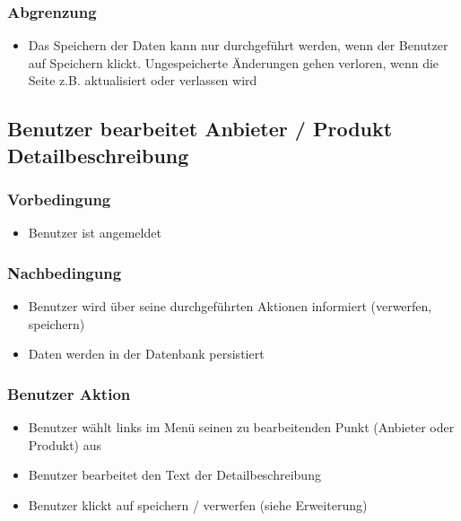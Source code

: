 \documentclass[a4paper,12pt]{article}
\begin{document}
\subsubsection{Abgrenzung}\label{abgrenzung-2}

\begin{itemize}

\item
  Das Speichern der Daten kann nur durchgeführt werden, wenn der
  Benutzer auf Speichern klickt. Ungespeicherte Änderungen gehen
  verloren, wenn die Seite z.B. aktualisiert oder verlassen wird
\end{itemize}

\subsection{Benutzer bearbeitet Anbieter / Produkt Detailbeschreibung}

\subsubsection{Vorbedingung}\label{vorbedingung-3}

\begin{itemize}

\item
  Benutzer ist angemeldet
\end{itemize}

\subsubsection{Nachbedingung}\label{nachbedingung-3}

\begin{itemize}

\item
  Benutzer wird über seine durchgeführten Aktionen informiert
  (verwerfen, speichern)
\item
  Daten werden in der Datenbank persistiert
\end{itemize}

\subsubsection{Benutzer Aktion}\label{benutzer-aktion-3}

\begin{itemize}

\item
  Benutzer wählt links im Menü seinen zu bearbeitenden Punkt (Anbieter
  oder Produkt) aus
\item
  Benutzer bearbeitet den Text der Detailbeschreibung
\item
  Benutzer klickt auf speichern / verwerfen (siehe Erweiterung)
\end{itemize}
\end{document}
